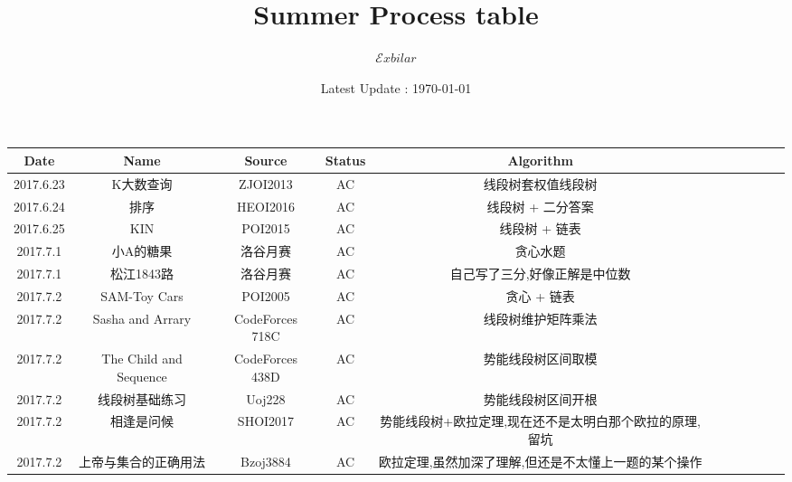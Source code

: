 \documentclass[landscape]{article}
\date{Latest Update : \today}
\title{Summer Process table}
\author{$\mathcal Exbilar$}
\begin{document}
\maketitle

\begin{longtable}{ccccccccccc}
  
  \hline
  Date & Name & Source & Status & Algorithm\\
  \hline
  2017.6.23 & K大数查询 & ZJOI2013 & AC & 线段树套权值线段树\\
  \hline
  2017.6.24 & 排序 & HEOI2016 & AC & 线段树 + 二分答案\\
  \hline
  2017.6.25 & KIN & POI2015 & AC & 线段树 + 链表\\
  \hline
  2017.7.1 & 小A的糖果 & 洛谷月赛 & AC & 贪心水题\\
  \hline
  2017.7.1 & 松江1843路 & 洛谷月赛 & AC & 自己写了三分,好像正解是中位数\\
  \hline
  2017.7.2 & SAM-Toy Cars & POI2005 & AC & 贪心 + 链表\\
  \hline
  2017.7.2 & Sasha and Arrary & CodeForces 718C & AC & 线段树维护矩阵乘法\\
  \hline
  2017.7.2 & The Child and Sequence & CodeForces 438D & AC & 势能线段树区间取模\\
  \hline
  2017.7.2 & 线段树基础练习 & Uoj228 & AC & 势能线段树区间开根\\
  \hline
  2017.7.2 & 相逢是问候 & SHOI2017 & AC & 势能线段树+欧拉定理,现在还不是太明白那个欧拉的原理,留坑\\
  \hline
  2017.7.2 & 上帝与集合的正确用法 & Bzoj3884 & AC & 欧拉定理,虽然加深了理解,但还是不太懂上一题的某个操作\\
  \hline
  
\end{longtable}
\end{document}

